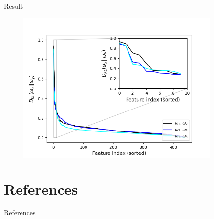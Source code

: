 \documentclass{beamer}					%
\begin{document}
\begin{frame}{Result}
\begin{center}
\begin{figure}
\includegraphics[width=0.9\textwidth]{kld.png}
\end{figure}
\end{center}
\end{frame}

\section{References}

\begin{frame}[allowframebreaks]{References}
	\tiny
	
\end{frame}
\end{document}
